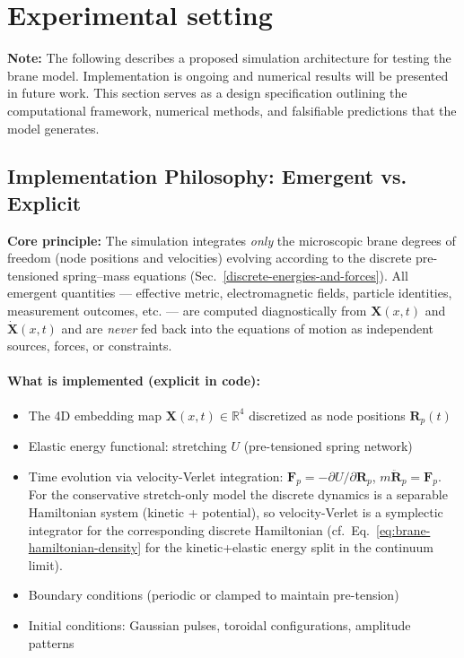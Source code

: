 \section{Experimental setting}\label{experimental-setting}

\textbf{Note:} The following describes a proposed simulation architecture for testing the brane model. Implementation is ongoing and numerical results will be presented in future work. This section serves as a design specification outlining the computational framework, numerical methods, and falsifiable predictions that the model generates.

\subsection{Implementation Philosophy: Emergent vs. Explicit}\label{implementation-philosophy}

\textbf{Core principle:} The simulation integrates \emph{only} the microscopic
brane degrees of freedom (node positions and velocities) evolving according to
the discrete pre-tensioned spring--mass equations (Sec.~\ref{discrete-energies-and-forces}).
All emergent quantities
— effective metric, electromagnetic fields, particle identities, measurement
outcomes, etc. — are computed diagnostically from $\mathbf X(x,t)$ and
$\dot{\mathbf X}(x,t)$ and are \emph{never} fed back into the equations of motion
as independent sources, forces, or constraints.

\paragraph{What is implemented (explicit in code):}
\begin{itemize}
\item The 4D embedding map $\mathbf{X}(x,t) \in \mathbb{R}^4$ discretized as node positions $\mathbf{R}_p(t)$
\item Elastic energy functional: stretching $U$ (pre-tensioned spring network)
\item Time evolution via velocity-Verlet integration: $\mathbf{F}_p = -\partial U/\partial \mathbf{R}_p$, $m \ddot{\mathbf{R}}_p = \mathbf{F}_p$. For the conservative stretch-only model the discrete dynamics is a separable Hamiltonian system (kinetic + potential), so velocity-Verlet is a symplectic integrator for the corresponding discrete Hamiltonian (cf.\ Eq.~\eqref{eq:brane-hamiltonian-density} for the kinetic+elastic energy split in the continuum limit).
\item Boundary conditions (periodic or clamped to maintain pre-tension)
\item Initial conditions: Gaussian pulses, toroidal configurations, amplitude patterns
\end{itemize}

